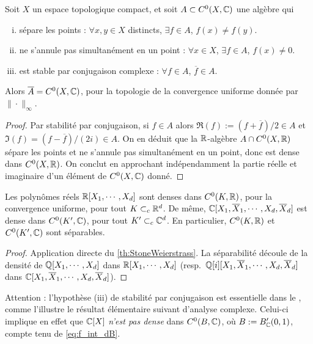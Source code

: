 \begin{corollary}
\label{corol:StoneComplexe}
%
	Soit $X$ un espace topologique compact, et soit $A \subset C^0(X,\mathbb{C})$ une algèbre qui
	\begin{enumerate}[(i)]
		\item sépare les points : $\forall x,y \in X$ distincts, $\exists f \in A$, $f(x) \neq f(y)$.
		\item ne s'annule pas simultanément en un point : $\forall x \in X$, $\exists f \in A$, $f(x)\neq 0$.
		\item est stable par conjugaison complexe : $\forall f \in A$, $\overline f \in A$.
	\end{enumerate}
	Alors $\overline A = C^0(X,\mathbb{C})$, pour la topologie de la convergence uniforme donnée par $\|\cdot\|_\infty$.
\end{corollary}

\begin{proof}
	Par stabilité par conjugaison, si $f \in A$ alors $\Re(f) := (f+\overline f)/2\in A$ et $\Im(f) = (f-\overline f)/(2i)\in A$. On en déduit que la $\mathbb{R}$-algèbre $A \cap C^0(X,\mathbb{R})$ sépare les points et ne s'annule pas simultanément en un point, donc est dense dans $C^0(X,\mathbb{R})$. On conclut en approchant indépendamment la partie réelle et imaginaire d'un élément de $C^0(X,\mathbb{C})$ donné. 
\end{proof}

\begin{remark}
\label{rem:polDens}
%
Les polynômes réels $\mathbb{R}[X_1,\cdots,\allowbreak X_d]$ sont denses dans $C^0(K,\mathbb{R})$,  pour la convergence uniforme, pour tout $K \subset_c \mathbb{R}^d$. 
De même, $\mathbb{C}[X_1,\overline X_1,\cdots,X_d,\overline X_d]$ est dense dans $C^0(K',\mathbb{C})$, pour tout $K'\subset_c \mathbb{C}^d$. En particulier, $C^0(K,\mathbb{R})$ et $C^0(K',\mathbb{C})$ sont séparables.
\end{remark}

\begin{proof}
	Application directe du \cref{th:StoneWeierstrass}. La séparabilité découle de la densité de $\mathbb{Q}[X_1,\cdots,\allowbreak X_d]$ dans $\mathbb{R}[X_1,\cdots,X_d]$ (resp.\ $\mathbb{Q}[i][X_1,\overline X_1,\cdots,X_d,\overline X_d]$ dans $\mathbb{C}[X_1,\overline X_1,\cdots,X_d,\overline X_d]$).
\end{proof}

Attention : l'hypothèse (iii) de stabilité par conjugaison est essentielle dans le , comme l'illustre le résultat élémentaire suivant d'analyse complexe. Celui-ci implique en effet que $\mathbb{C}[X]$ \emph{n'est pas dense} dans $C^0(B,\mathbb{C})$, où $B:=B'_{\mathbb{C}}(0,1)$, compte tenu de \eqref{eq:f_int_dB}. 

